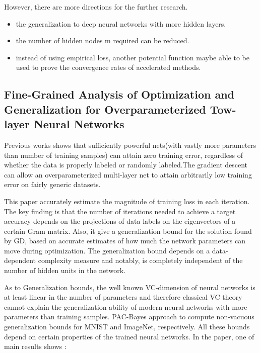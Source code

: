 \documentclass{article}
\begin{document}
However, there are more directions for the further research. 
\begin{itemize}
\item the generalization to deep neural networks with more hidden layers.
\item the number of hidden nodes m required can be reduced. 
\item instead of using empirical loss, another potential function maybe able to be used to prove the convergence rates of accelerated methods. 
\end{itemize}

\subsection{Fine-Grained Analysis of Optimization and Generalization for Overparameterized Tow-layer Neural Networks}
Previous works shows that sufficiently powerful nets(with vastly more parameters than number of training samples) can attain zero training error, regardless of whether the data is properly labeled or randomly labeled.The gradient descent can allow an overparameterized multi-layer net to attain arbitrarily low training error on fairly generic datasets.

This paper accurately estimate the magnitude of training loss in each iteration. The key finding is that the number of iterations needed to achieve a target accuracy depends on the projections of data labels on the eigenvectors of a certain Gram matrix. Also, it give a generalization bound for the solution found by GD, based on accurate estimates of how much the network parameters can move during optimization. The generalization bound depends on a data-dependent complexity measure and notably, is completely independent of the number of hidden units in the network.

As to Generalization bounds, the well known VC-dimension of neural networks is at least linear in the number of parameters and therefore classical VC theory cannot explain the generalization ability of modern neural networks with more parameters than training samples. PAC-Bayes approach to compute non-vacuous generalization bounds for MNIST and ImageNet, respectively. All these bounds depend on certain properties of the trained neural networks. In the paper, one of main results shows :
\end{document}
